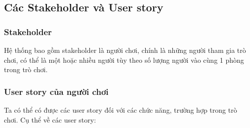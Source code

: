 \subsection{Các Stakeholder và User story}
\subsubsection{Stakeholder}
Hệ thống bao gồm stakeholder là người chơi, chính là những người tham gia trò chơi, có thể là một hoặc nhiều người tùy theo số lượng người vào cùng 1 phòng trong trò chơi.
\subsubsection{User story của người chơi}
Ta có thể có được các user story đối với các chức năng, trường hợp trong trò chơi. Cụ thể về các user story:

